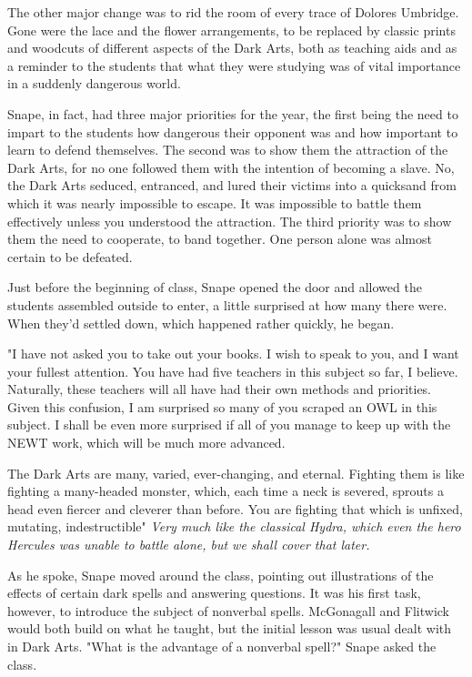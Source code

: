 The other major change was to rid the room of every trace of Dolores Umbridge. Gone were the lace and the flower arrangements, to be replaced by classic prints and woodcuts of different aspects of the Dark Arts, both as teaching aids and as a reminder to the students that what they were studying was of vital importance in a suddenly dangerous world.

Snape, in fact, had three major priorities for the year, the first being the need to impart to the students how dangerous their opponent was and how important to learn to defend themselves. The second was to show them the attraction of the Dark Arts, for no one followed them with the intention of becoming a slave. No, the Dark Arts seduced, entranced, and lured their victims into a quicksand from which it was nearly impossible to escape. It was impossible to battle them effectively unless you understood the attraction. The third priority was to show them the need to cooperate, to band together. One person alone was almost certain to be defeated.

Just before the beginning of class, Snape opened the door and allowed the students assembled outside to enter, a little surprised at how many there were. When they'd settled down, which happened rather quickly, he began.

"I have not asked you to take out your books. I wish to speak to you, and I want your fullest attention. You have had five teachers in this subject so far, I believe. Naturally, these teachers will all have had their own methods and priorities. Given this confusion, I am surprised so many of you scraped an OWL in this subject. I shall be even more surprised if all of you manage to keep up with the NEWT work, which will be much more advanced.

\textooquote The Dark Arts are many, varied, ever-changing, and eternal. Fighting them is like fighting a many-headed monster, which, each time a neck is severed, sprouts a head even fiercer and cleverer than before. You are fighting that which is unfixed, mutating, indestructible{\el}" \emph{Very much like the classical Hydra, which even the hero Hercules was unable to battle alone, but we shall cover that later.}

As he spoke, Snape moved around the class, pointing out illustrations of the effects of certain dark spells and answering questions. It was his first task, however, to introduce the subject of nonverbal spells. McGonagall and Flitwick would both build on what he taught, but the initial lesson was usual dealt with in Dark Arts. "What is the advantage of a nonverbal spell?" Snape asked the class.

